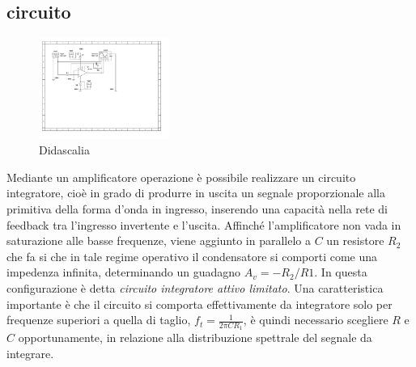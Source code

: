 \documentclass[journal]{IEEEtran}
\begin{document}
\subsection{\textbf{circuito}}
\begin{figure}[H]%
\begin {center}
\includegraphics[width=0.38\textwidth]{sch-simulations/output/OPA-integratore.pdf}
\caption{Didascalia}
\label{fig:oscilloscope}
\end {center}
\end{figure}
Mediante un amplificatore operazione è possibile realizzare un circuito integratore, cioè in grado di produrre in uscita un segnale proporzionale alla primitiva della forma d'onda in ingresso, inserendo una capacità nella rete di feedback tra l'ingresso invertente e l'uscita.
Affinché l'amplificatore non vada in saturazione alle basse frequenze, viene aggiunto in parallelo a $C$ un resistore $R_{2}$ che fa si che in tale regime operativo il condensatore si comporti come una impedenza infinita, determinando un guadagno $A_{v}=-R_{2}/R{1}$. In questa configurazione è detta \textit{circuito integratore attivo limitato}. 
Una caratteristica importante è che il circuito si comporta effettivamente da integratore solo per frequenze superiori a quella di taglio, $f_{t}=\frac{1}{2 \pi C R_{1} }$, è quindi necessario scegliere $R$ e $C$ opportunamente, in relazione alla distribuzione spettrale del segnale da integrare. 
\end{document}
